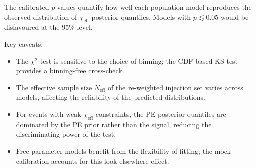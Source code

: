 \documentclass[11pt,a4paper]{article}
\newcommand{\chieff}{\ensuremath{\chi_\mathrm{eff}}\xspace}
\begin{document}
The calibrated $p$-values quantify how well each population model reproduces
the observed distribution of \chieff posterior quantiles.  Models with
$p \lesssim 0.05$ would be disfavoured at the 95\% level.

Key caveats:
\begin{itemize}
  \item The $\chi^2$ test is sensitive to the choice of binning; the
        CDF-based KS test provides a binning-free cross-check.
  \item The effective sample size $N_\mathrm{eff}$ of the re-weighted
        injection set varies across models, affecting the reliability
        of the predicted distributions.
  \item For events with weak \chieff constraints, the PE posterior quantiles
        are dominated by the PE prior rather than the signal, reducing the
        discriminating power of the test.
  \item Free-parameter models benefit from the flexibility of fitting;
        the mock calibration accounts for this look-elsewhere effect.
\end{itemize}
\end{document}
